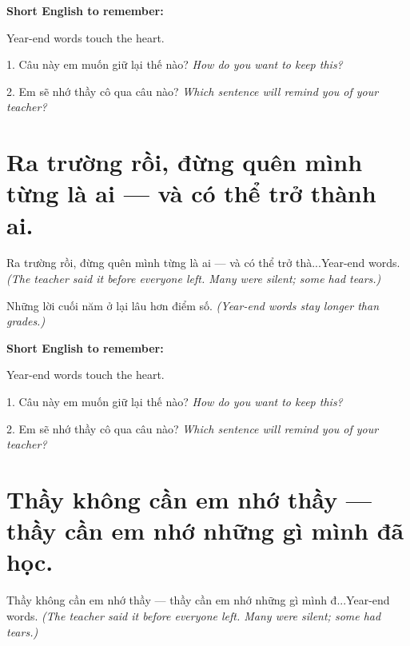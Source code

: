 \begin{ghinhoanh}
\textbf{Short English to remember:}

Year-end words touch the heart.

\end{ghinhoanh}

\begin{tuhocnhanh}
1. Câu này em muốn giữ lại thế nào? \textit{How do you want to keep this?}

2. Em sẽ nhớ thầy cô qua câu nào? \textit{Which sentence will remind you of your teacher?}
\end{tuhocnhanh}
\ngancach


\section{Ra trường rồi, đừng quên mình từng là ai — và có thể trở thành ai.}
\begin{truyen}{Ra trường rồi, đừng quên mình từng là ai — và có thể trở thà...}{Year-end words.}
\textit{(The teacher said it before everyone left. Many were silent; some had tears.)}
\end{truyen}

\begin{baihoc}
Những lời cuối năm ở lại lâu hơn điểm số.
\textit{(Year-end words stay longer than grades.)}
\end{baihoc}

\begin{ghinhoanh}
\textbf{Short English to remember:}

Year-end words touch the heart.

\end{ghinhoanh}

\begin{tuhocnhanh}
1. Câu này em muốn giữ lại thế nào? \textit{How do you want to keep this?}

2. Em sẽ nhớ thầy cô qua câu nào? \textit{Which sentence will remind you of your teacher?}
\end{tuhocnhanh}
\ngancach


\section{Thầy không cần em nhớ thầy — thầy cần em nhớ những gì mình đã học.}
\begin{truyen}{Thầy không cần em nhớ thầy — thầy cần em nhớ những gì mình đ...}{Year-end words.}
\textit{(The teacher said it before everyone left. Many were silent; some had tears.)}
\end{truyen}

